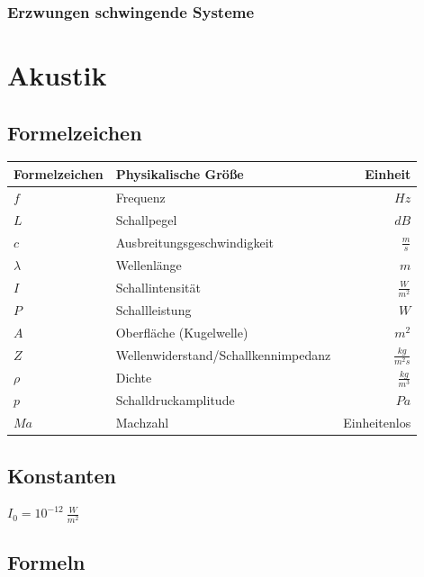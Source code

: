 \documentclass[12pt, a4paper]{scrreprt}
\begin{document}
\subsection{Erzwungen schwingende Systeme}


\chapter{Akustik}

\section{Formelzeichen}

\begin{center}
  \makegapedcells{}
  \begin{tabular}{l l r}
    Formelzeichen & Physikalische Größe & Einheit\\
    \hline \hline
    \(f\) & Frequenz & \(Hz\)\\ \hline
    \(L\) & Schallpegel & \(dB\)\\ \hline
    \(c\) & Ausbreitungsgeschwindigkeit & \(\frac{m}{s}\)\\ \hline
    \(\lambda\) & Wellenlänge & \(m\)\\ \hline
    \(I\) & Schallintensität & \(\frac{W}{m^2}\)\\ \hline
    \(P\) & Schallleistung & \(W\)\\ \hline
    \(A\) & Oberfläche (Kugelwelle) & \(m^2\)\\ \hline
    \(Z\) & Wellenwiderstand/Schallkennimpedanz & \(\frac{kg}{m^2s}\)\\ \hline
    \(\rho\) & Dichte & \(\frac{kg}{m^3}\)\\ \hline
    \(p\) & Schalldruckamplitude & \(Pa\)\\ \hline
    \(Ma\) & Machzahl & Einheitenlos\\ \hline
  \end{tabular}
\end{center}

\section{Konstanten}
\(I_0 = 10^{-12}\ \frac{W}{m^2}\)

\section{Formeln}
\end{document}
